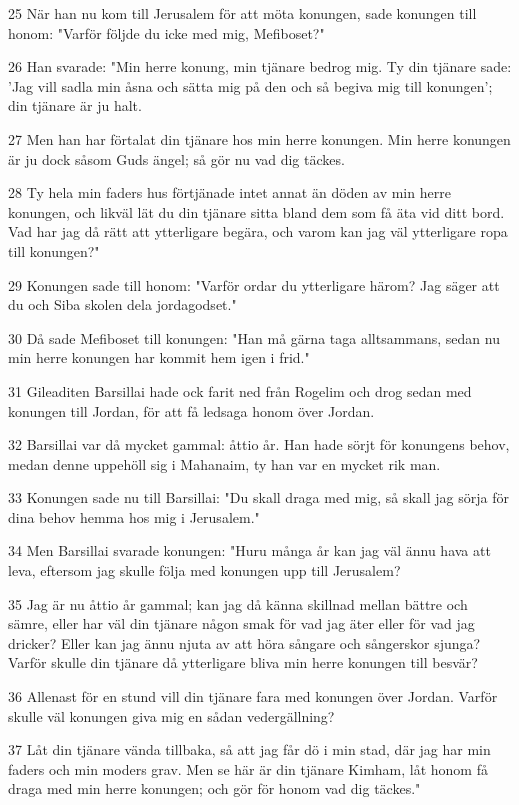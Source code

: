 \par 25 När han nu kom till Jerusalem för att möta konungen, sade konungen till honom: "Varför följde du icke med mig, Mefiboset?"
\par 26 Han svarade: "Min herre konung, min tjänare bedrog mig. Ty din tjänare sade: 'Jag vill sadla min åsna och sätta mig på den och så begiva mig till konungen'; din tjänare är ju halt.
\par 27 Men han har förtalat din tjänare hos min herre konungen. Min herre konungen är ju dock såsom Guds ängel; så gör nu vad dig täckes.
\par 28 Ty hela min faders hus förtjänade intet annat än döden av min herre konungen, och likväl lät du din tjänare sitta bland dem som få äta vid ditt bord. Vad har jag då rätt att ytterligare begära, och varom kan jag väl ytterligare ropa till konungen?"
\par 29 Konungen sade till honom: "Varför ordar du ytterligare härom? Jag säger att du och Siba skolen dela jordagodset."
\par 30 Då sade Mefiboset till konungen: "Han må gärna taga alltsammans, sedan nu min herre konungen har kommit hem igen i frid."
\par 31 Gileaditen Barsillai hade ock farit ned från Rogelim och drog sedan med konungen till Jordan, för att få ledsaga honom över Jordan.
\par 32 Barsillai var då mycket gammal: åttio år. Han hade sörjt för konungens behov, medan denne uppehöll sig i Mahanaim, ty han var en mycket rik man.
\par 33 Konungen sade nu till Barsillai: "Du skall draga med mig, så skall jag sörja för dina behov hemma hos mig i Jerusalem."
\par 34 Men Barsillai svarade konungen: "Huru många år kan jag väl ännu hava att leva, eftersom jag skulle följa med konungen upp till Jerusalem?
\par 35 Jag är nu åttio år gammal; kan jag då känna skillnad mellan bättre och sämre, eller har väl din tjänare någon smak för vad jag äter eller för vad jag dricker? Eller kan jag ännu njuta av att höra sångare och sångerskor sjunga? Varför skulle din tjänare då ytterligare bliva min herre konungen till besvär?
\par 36 Allenast för en stund vill din tjänare fara med konungen över Jordan. Varför skulle väl konungen giva mig en sådan vedergällning?
\par 37 Låt din tjänare vända tillbaka, så att jag får dö i min stad, där jag har min faders och min moders grav. Men se här är din tjänare Kimham, låt honom få draga med min herre konungen; och gör för honom vad dig täckes."
